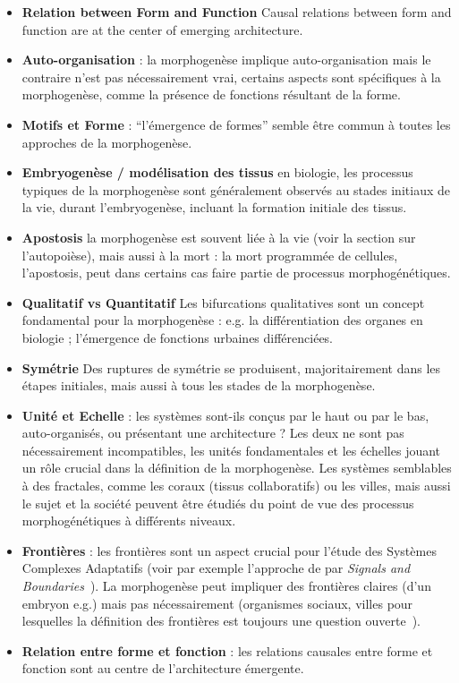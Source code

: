 {\begin{itemize}
\item \textbf{Relation between Form and Function} Causal relations between form and function are at the center of emerging architecture.
\end{itemize}
}{
\begin{itemize}
\item \textbf{Auto-organisation} : la morphogenèse implique auto-organisation mais le contraire n'est pas nécessairement vrai, certains aspects sont spécifiques à la morphogenèse, comme la présence de fonctions résultant de la forme.
\item \textbf{Motifs et Forme} : ``l'émergence de formes'' semble être commun à toutes les approches de la morphogenèse.
\item \textbf{Embryogenèse / modélisation des tissus} en biologie, les processus typiques de la morphogenèse sont généralement observés au stades initiaux de la vie, durant l'embryogenèse, incluant la formation initiale des tissus.
\item \textbf{Apostosis} la morphogenèse est souvent liée à la vie (voir la section sur l'autopoièse), mais aussi à la mort : la mort programmée de cellules, l'apostosis, peut dans certains cas faire partie de processus morphogénétiques.
\item \textbf{Qualitatif vs Quantitatif} Les bifurcations qualitatives sont un concept fondamental pour la morphogenèse : e.g. la différentiation des organes en biologie ; l'émergence de fonctions urbaines différenciées.
\item \textbf{Symétrie} Des ruptures de symétrie se produisent, majoritairement dans les étapes initiales, mais aussi à tous les stades de la morphogenèse.
\item \textbf{Unité et Echelle} : les systèmes sont-ils conçus par le haut ou par le bas, auto-organisés, ou présentant une architecture ? Les deux ne sont pas nécessairement incompatibles, les unités fondamentales et les échelles jouant un rôle crucial dans la définition de la morphogenèse. Les systèmes semblables à des fractales, comme les coraux (tissus collaboratifs) ou les villes, mais aussi le sujet et la société peuvent être étudiés du point de vue des processus morphogénétiques à différents niveaux.
\item \textbf{Frontières} : les frontières sont un aspect crucial pour l'étude des Systèmes Complexes Adaptatifs (voir par exemple l'approche de  par \emph{Signals and Boundaries}~\cite{holland2012signals}). La morphogenèse peut impliquer des frontières claires (d'un embryon e.g.) mais pas nécessairement (organismes sociaux, villes pour lesquelles la définition des frontières est toujours une question ouverte~\cite{2015arXiv150707878C}).
\item \textbf{Relation entre forme et fonction} : les relations causales entre forme et fonction sont au centre de l'architecture émergente.
\end{itemize}
}



